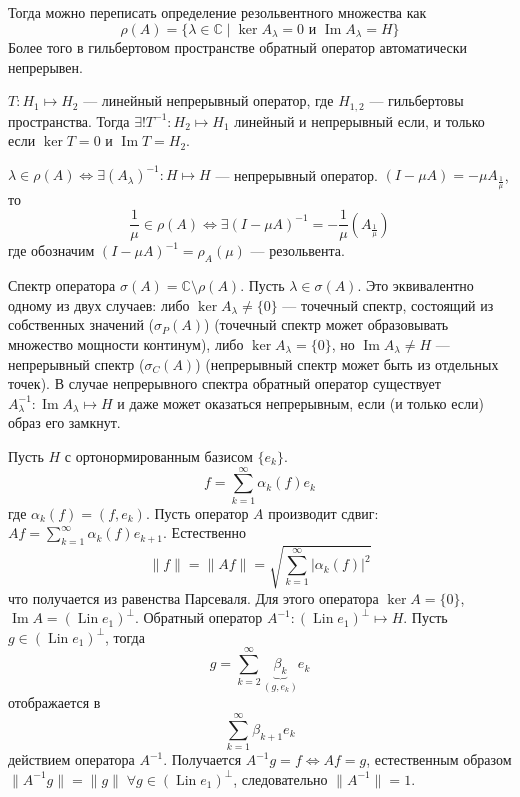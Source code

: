 \documentclass[12pt]{article}
\renewcommand{\Im}{\operatorname{Im}}
\DeclareMathOperator{\Lin}{Lin}
\begin{document}
Тогда можно переписать определение резольвентного множества как 
$$
\rho(A) = \{\lambda \in \mathbb C \mid \ker A_\lambda = 0\text{ и }\Im A_\lambda = H \}
$$
Более того в гильбертовом пространстве обратный оператор автоматически непрерывен.

\begin{Zam}
    $T:H_1 \mapsto H_2$ --- линейный непрерывный оператор, где $H_{1,2}$ --- гильбертовы пространства.
    Тогда $\exists! T^{-1} : H_2 \mapsto H_1$ линейный и непрерывный если, и только если $\ker T = 0$ и $\Im T = H_2$.
\end{Zam}

    $\lambda \in \rho(A) \Leftrightarrow \exists(A_\lambda)^{-1} : H \mapsto H$ --- непрерывный оператор.
    $(I - \mu A) = -\mu A_{\frac{1}{\mu}}$, то 
    $$
    \frac{1}{\mu} \in \rho(A) \Leftrightarrow \exists (I - \mu A)^{-1} = -\frac{1}{\mu}(A_{\frac{1}{\mu}})
    $$
    где обозначим $(I - \mu A)^{-1} = \rho_A(\mu)$ --- резольвента.
\begin{Opr}
    Спектр оператора $\sigma(A) = \mathbb C \setminus \rho(A)$. Пусть $\lambda \in \sigma(A)$.
    Это эквивалентно одному из двух случаев:
    либо $\ker A_\lambda \ne \{0\}$ --- точечный спектр, состоящий из собственных значений ($\sigma_P(A)$) (точечный спектр может образовывать множество мощности континум),
    либо $\ker A_\lambda = \{0\}$, но $\Im A_\lambda \ne H$ --- непрерывный спектр ($\sigma_C(A)$) (непрерывный спектр может быть из отдельных точек).
    В случае непрерывного спектра обратный оператор существует $A_\lambda^{-1} : \Im A_\lambda \mapsto H$ и даже может оказаться непрерывным, если (и только если) образ его
    замкнут.
\end{Opr}

\begin{Prim}
    Пусть $H$ с ортонормированным базисом $\{e_k\}$.
    $$
    f = \sum \limits_{k = 1}^{\infty} \alpha_k(f) e_k
    $$
    где $\alpha_k(f)=(f, e_k)$.
    Пусть оператор $A$ производит сдвиг: $Af = \sum \limits_{k = 1}^{\infty} \alpha_k(f) e_{k+1}$.
    Естественно 
    $$
    \|f\| = \|Af\| = \sqrt{\sum \limits_{k = 1}^{\infty} |\alpha_k(f)|^2}
    $$
    что получается из равенства Парсеваля.
    Для этого оператора
    $\ker A = \{0\}$, $\Im A = (\Lin e_1)^{\perp}$.
    Обратный оператор
    $A^{-1} : (\Lin e_1)^{\perp} \mapsto H$. Пусть $g \in (\Lin e_1)^{\perp}$, тогда
    $$
    g = \sum \limits_{k = 2}^{\infty}\underbrace{\beta_k}_{(g, e_k)}e_k
    $$ 
    отображается в 
    $$
    \sum\limits_{k = 1}^{\infty} \beta_{k + 1}e_k
    $$
    действием оператора $A^{-1}$.
    Получается $A^{-1}g = f \Leftrightarrow Af = g$, естественным образом $\|A^{-1}g\| = \|g\|\; \forall g \in (\Lin e_1)^{\perp}$, следовательно $\|A^{-1}\| = 1$.
\end{Prim}
\end{document}
